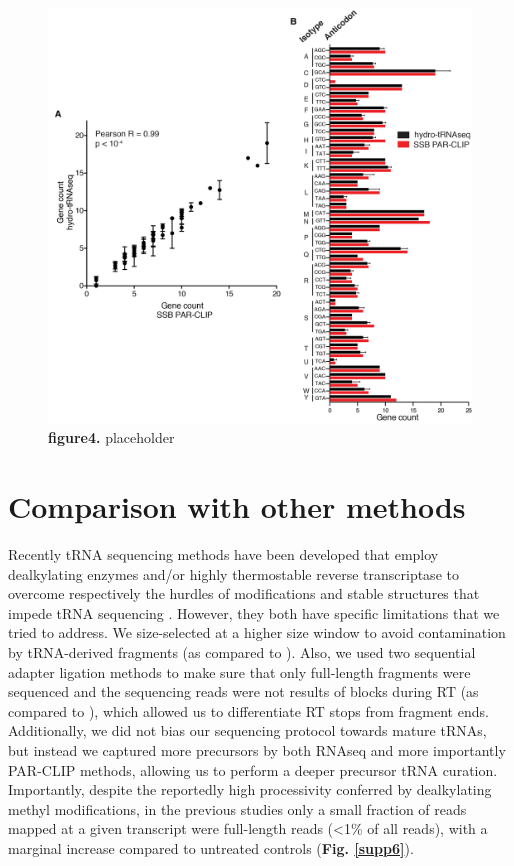 \documentclass[12pt]{rockefeller}
\begin{document}
\begin{figure}[!ht]%
\centering
\includegraphics[width=\textwidth]{paper4_two.png}%
\caption[figure4]
{\textbf{figure4.}
placeholder}
\centering
\label{paper4}%
\end{figure}

\section{Comparison with other methods}

Recently tRNA sequencing methods have been developed that employ dealkylating enzymes and/or highly thermostable reverse transcriptase to overcome respectively the hurdles of modifications and stable structures that impede tRNA sequencing \cite{Cozen:2015ds, Zheng:2015dw}. However, they both have specific limitations that we tried to address. We size-selected at a higher size window to avoid contamination by tRNA-derived fragments (as compared to \cite{Cozen:2015ds}). Also, we used two sequential adapter ligation methods to make sure that only full-length fragments were sequenced and the sequencing reads were not results of blocks during RT (as compared to \cite{Zheng:2015dw}), which allowed us to differentiate RT stops from fragment ends. Additionally, we did not bias our sequencing protocol towards mature tRNAs, but instead we captured more precursors by both RNAseq and more importantly PAR-CLIP methods, allowing us to perform a deeper precursor tRNA curation. Importantly, despite the reportedly high processivity conferred by dealkylating methyl modifications, in the previous studies only a small fraction of reads mapped at a given transcript were full-length reads (<1\% of all reads), with a marginal increase compared to untreated controls (\textbf{Fig. \ref{supp6}}). 
\end{document}
